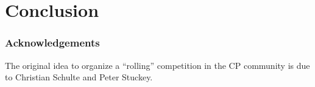 \section{Conclusion}
\label{sec:conclusion}

\subsubsection*{Acknowledgements}
The original idea to organize a ``rolling'' competition in the CP community is due to Christian Schulte and Peter Stuckey.
